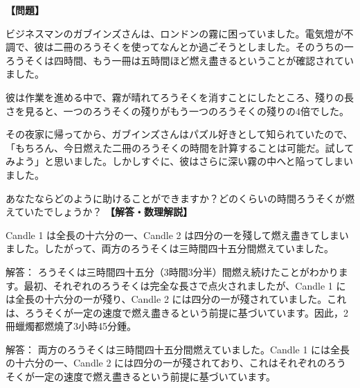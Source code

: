 \documentclass[10pt,a4paper,oneside,openany]{ltjsbook}
\begin{document}
\begin{tcolorbox}[colback=softblue,colframe=primaryblue,title=\textbf{第 102 問：MR. GUBBINS IN A FOG.},arc=2mm,boxrule=1pt,breakable]
\textbf{【問題】}\par\vspace{0.3em}
ビジネスマンのガブインズさんは、ロンドンの霧に困っていました。電気燈が不調で、彼は二冊のろうそくを使ってなんとか過ごそうとしました。そのうちの一ろうそくは四時間、もう一冊は五時間ほど燃え盡きるということが確認されていました。

彼は作業を進める中で、霧が晴れてろうそくを消すことにしたところ、殘りの長さを見ると、一つのろうそくの殘りがもう一つのろうそくの殘りの4倍でした。

その夜家に帰ってから、ガブインズさんはパズル好きとして知られていたので、「もちろん、今日燃えた二冊のろうそくの時間を計算することは可能だ。試してみよう」と思いました。しかしすぐに、彼はさらに深い霧の中へと陥ってしまいました。

あなたならどのように助けることができますか？どのくらいの時間ろうそくが燃えていたでしょうか？
\tcblower
\textbf{【解答・数理解説】}\par\vspace{0.3em}
Candle 1 は全長の十六分の一、Candle 2 は四分の一を殘して燃え盡きてしまいました。したがって、両方のろうそくは三時間四十五分間燃えていました。

解答：
ろうそくは三時間四十五分（3時間3分半）間燃え続けたことがわかります。最初、それぞれのろうそくは完全な長さで点火されましたが、Candle 1 には全長の十六分の一が殘り、Candle 2 には四分の一が殘されていました。これは、ろうそくが一定の速度で燃え盡きるという前提に基づいています。因此，2冊蠟燭都燃燒了3小時45分鍾。

解答：
両方のろうそくは三時間四十五分間燃えていました。Candle 1 には全長の十六分の一、Candle 2 には四分の一が殘されており、これはそれぞれのろうそくが一定の速度で燃え盡きるという前提に基づいています。
\end{tcolorbox}
\end{document}
